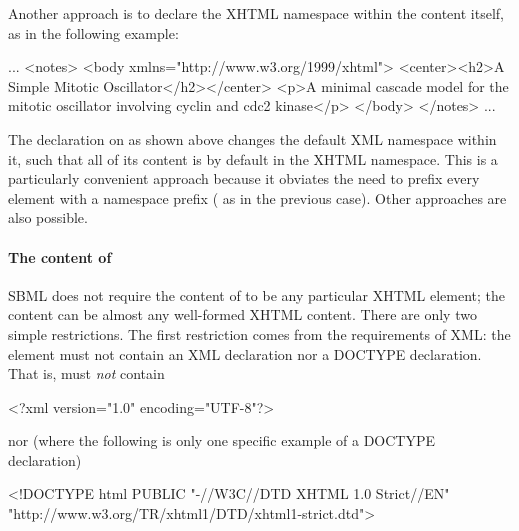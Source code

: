 Another approach is to declare the XHTML namespace within the
 content itself, as in the following example:

\begin{example}
...
<notes>
  <body xmlns="http://www.w3.org/1999/xhtml">
    <center><h2>A Simple Mitotic Oscillator</h2></center>
    <p>A minimal cascade model for the mitotic oscillator
    involving cyclin and cdc2 kinase</p>
  </body>
</notes>
...
\end{example}

The  declaration on
 as shown above changes the default XML namespace
within it, such that all of its content is by default in the XHTML
namespace.  This is a particularly convenient approach because it
obviates the need to prefix every element with a namespace prefix
(\eg {} as in the previous case).  Other
approaches are also possible.


\paragraph{The content of }

SBML does not require the content of  to be any
particular XHTML element; the content can be almost any
well-formed XHTML content.  There are only two simple
restrictions.  The first restriction comes from the requirements
of XML: the  element must not contain an XML
declaration nor a DOCTYPE declaration.  That is, 
must \emph{not} contain

\begin{example}
<?xml version="1.0" encoding="UTF-8"?>  
\end{example}

nor (where the following is only one specific example of a
DOCTYPE declaration)

\begin{example}
<!DOCTYPE html PUBLIC "-//W3C//DTD XHTML 1.0 Strict//EN"
 "http://www.w3.org/TR/xhtml1/DTD/xhtml1-strict.dtd">
\end{example}

